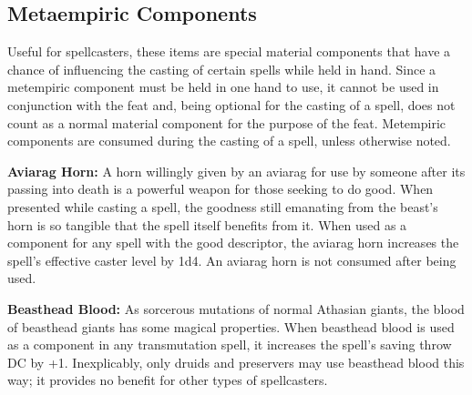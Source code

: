\subsection{Metaempiric Components}

Useful for spellcasters, these items are special material components that have a chance of influencing the casting of certain spells while held in hand. Since a metempiric component must be held in one hand to use, it cannot be used in conjunction with the  feat and, being optional for the casting of a spell, does not count as a normal material component for the purpose of the  feat. Metempiric components are consumed during the casting of a spell, unless otherwise noted.

\textbf{Aviarag Horn:} A horn willingly given by an aviarag for use by someone after its passing into death is a powerful weapon for those seeking to do good. When presented while casting a spell, the goodness still emanating from the beast's horn is so tangible that the spell itself benefits from it. When used as a component for any spell with the good descriptor, the aviarag horn increases the spell's effective caster level by 1d4. An aviarag horn is not consumed after being used.

\textbf{Beasthead Blood:} As sorcerous mutations of normal Athasian giants, the blood of beasthead giants has some magical properties. When beasthead blood is used as a component in any transmutation spell, it increases the spell's saving throw DC by +1. Inexplicably, only druids and preservers may use beasthead blood this way; it provides no benefit for other types of spellcasters.

